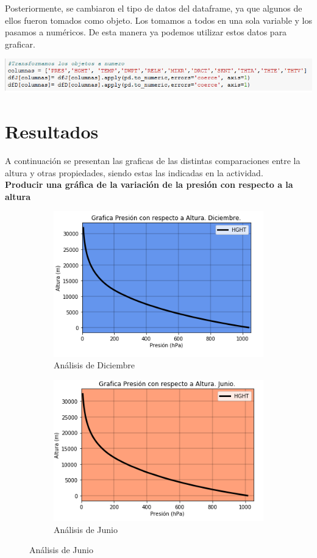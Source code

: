 \documentclass[12pt]{article}
\begin{document}
Posteriormente, se cambiaron el tipo de datos del dataframe, ya que algunos de ellos fueron tomados como objeto. Los tomamos a todos en una sola variable y los pasamos a numéricos. De esta manera ya podemos utilizar estos datos para graficar. 

\begin{center}
\includegraphics[scale=0.65]{Cambia.png}
\end{center}

\section{Resultados}
A continuación se presentan las graficas de las distintas comparaciones entre la altura y otras propiedades, siendo estas las indicadas en la actividad. \\

\noindent\textbf{Producir una gráfica de la variación de la presión con respecto a la altura}
\begin{figure}[h!]
\begin{subfigure}{.55\textwidth}
  \centering
  \includegraphics[width=.8\linewidth]{GrafAPDec.png}
  \caption{Análisis de Diciembre}
  \label{fig:sfig1}
\end{subfigure}
\begin{subfigure}{.55\textwidth}
  \centering
  \includegraphics[width=.8\linewidth]{GrafAPJun.png}
  \caption{Análisis de Junio}
  \label{fig:sfig2}
\end{subfigure}
\end{figure}
\end{document}
